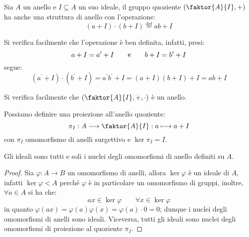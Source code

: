 \documentclass[11pt]{scrartcl}
\begin{document}
\begin{definition}
    Sia $A$ un anello e $I \subseteq A$ un suo ideale, il gruppo quoziente $\left(\faktor{A}{I}, +\right)$ ha anche una struttura di anello con l'operazione:
        \[ (a + I) \cdot (b + I) \stackrel{\text{def}}{=} ab + I
            \]
\end{definition}

\begin{remark}
    Si verifica facilmente che l'operazione è ben definita, infatti, presi:
        \[ a + I = a^{\prime} + I \qquad \text e \qquad b + I = b^{\prime} + I
            \]
    segue:
        \[ (a^{\prime} + I) \cdot (b^{\prime} + I) = a^{\prime}b^{\prime} + I = (a + I)(b + I) + I = ab + I
            \]
\end{remark}

\begin{remark}
    Si verifica facilmente che $\left(\faktor{A}{I},+,\cdot\right)$ è un anello.
\end{remark}

\begin{remark}
    Possiamo definire una proiezione all'anello quoziente:
        \[ \pi_I : A \longrightarrow \faktor{A}{I} : a \longmapsto a + I
            \]
    con $\pi_I$ omomorfismo di anelli surgettivo e $\ker \pi_I = I$.
\end{remark}

\begin{proposition}
    Gli ideali sono tutti e soli i nuclei degli omomorfismi di anello definiti su $A$.
\end{proposition}

\begin{proof}
    Sia $\varphi : A \longrightarrow B$ un omomorfismo di anelli, allora $\ker \varphi$ è un ideale di $A$, infatti $\ker \varphi < A$ perché $\varphi$ 
    è in particolare un omomorfismo di gruppi, inoltre, $\forall a \in A$ si ha che:
        \[ ax \in \ker \varphi \qquad \forall x \in \ker \varphi
            \]
    in quanto $\varphi(ax) = \varphi(a)\varphi(x) = \varphi(a) \cdot 0 = 0$; dunque i nuclei degli omomorfismi di anelli sono ideali. Viceversa, tutti gli ideali 
    sono nuclei degli omomorfismi di proiezione al quoziente $\pi_I$.
\end{proof}

\end{document}
